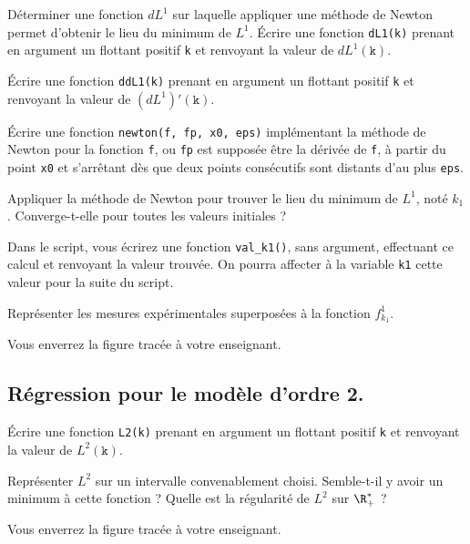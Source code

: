 \medskip{}

\question{} Déterminer une fonction $dL^1$ sur laquelle appliquer une méthode de Newton permet d'obtenir le lieu du minimum de $L^1$. 
Écrire une fonction \texttt{dL1(k)} prenant en argument un flottant positif \texttt{k} et renvoyant la valeur de $dL^1(\texttt k)$.

\medskip{}

\question{} Écrire une fonction \texttt{ddL1(k)} prenant en argument un flottant positif \texttt{k} et renvoyant la valeur de $(dL^1)'(\texttt k)$.

\medskip{}

\question{} \'Ecrire une fonction \texttt{newton(f, fp, x0, eps)} implémentant la méthode de Newton pour la fonction \texttt{f}, ou \texttt{fp} est supposée être la dérivée de \texttt{f}, à partir du point \texttt{x0} et s'arrêtant dès que deux points consécutifs sont distants d'au plus \texttt{eps}.

\medskip{}

\question{} Appliquer la méthode de Newton pour trouver le lieu du minimum de $L^1$, noté $k_1$. Converge-t-elle pour toutes les valeurs initiales ? 

Dans le script, vous écrirez une fonction \texttt{val\_k1()}, sans argument, effectuant ce calcul et renvoyant la valeur trouvée. On pourra affecter à la variable \texttt{k1} cette valeur pour la suite du script.

\question{\label{qu:tracef1}} Représenter les mesures expérimentales superposées à la fonction $f^1_{k_1}$.

  Vous enverrez la figure tracée à votre enseignant. 


\subsection{Régression pour le modèle d'ordre 2.}
\label{sec.reg.o2}

\question{} Écrire une fonction \texttt{L2(k)} prenant en argument un flottant positif \texttt{k} et renvoyant la valeur de $L^2(\texttt k)$.

\medskip{}

\question{\label{qu:traceL2}} Représenter $L^2$ sur un intervalle convenablement choisi. Semble-t-il y avoir un minimum à cette fonction ? Quelle est la régularité de $L^2$ sur $\R^\ast_+$ ?

  Vous enverrez la figure tracée à votre enseignant. 

\medskip{}  
  
